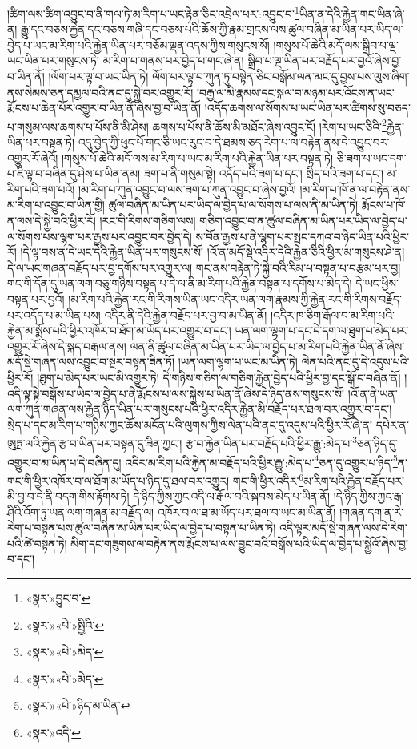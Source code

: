 །ཚིག་ལས་ཚིག་འབྱུང་བ་ནི་གལ་ཏེ་མ་རིག་པ་ཡང་རྟེན་ཅིང་འབྲེལ་པར་:འབྱུང་བ་\footnote{«སྣར་»བྱུང་བ་}ཡིན་ན་དེའི་རྐྱེན་གང་ཡིན་ཞེ་ན། རྒྱུ་དང་བཅས་རྐྱེན་དང་བཅས་གཞི་དང་བཅས་པའི་ཆོས་ཀྱི་རྣམ་གྲངས་ལས་ཚུལ་བཞིན་མ་ཡིན་པར་ཡིད་ལ་བྱེད་པ་ཡང་མ་རིག་པའི་རྐྱེན་ཡིན་པར་བཅོམ་ལྡན་འདས་ཀྱིས་གསུངས་སོ། །གསུས་པོ་ཆེའི་མདོ་ལས་སྒྲིབ་པ་ལྔ་ཡང་ཡིན་པར་གསུངས་ཏེ། མ་རིག་པ་གནས་པར་བྱེད་པ་གང་ཞེ་ན། སྒྲིབ་པ་ལྔ་ཡིན་པར་བརྗོད་པར་བྱའོ་ཞེས་བྱ་བ་ཡིན་ནོ། །ལོག་པར་ལྟ་བ་ཡང་ཡིན་ཏེ། ལོག་པར་ལྟ་བ་ཀུན་ཏུ་བསྟེན་ཅིང་བསྒོམ་ལན་མང་དུ་བྱས་པས་ལུས་ཞིག་ནས་སེམས་ཅན་དམྱལ་བའི་ནང་དུ་སྐྱེ་བར་འགྱུར་རོ། །བརྒྱ་ལ་མི་རྣམས་དང་སྐལ་བ་མཉམ་པར་འོངས་ན་ཡང་རྨོངས་པ་ཆེན་པོར་འགྱུར་བ་ཡིན་ནོ་ཞེས་བྱ་བ་ཡིན་ནོ། །འདོད་ཆགས་ལ་སོགས་པ་ཡང་ཡིན་པར་ཚིགས་སུ་བཅད་པ་གསུམ་ལས་ཆགས་པ་པོས་ནི་མི་ཤེས། ཆགས་པ་པོས་ནི་ཆོས་མི་མཐོང་ཞེས་འབྱུང་ངོ། །རེག་པ་ཡང་ཅིའི་\footnote{«སྣར་»«པེ་»སྤྱིའི་}རྐྱེན་ཡིན་པར་བསྟན་ཏེ། འདུ་བྱེད་ཀྱི་ཕུང་པོ་གང་ཅི་ཡང་རུང་བ་དེ་ཐམས་ཅད་རེག་པ་ལ་བརྟེན་ནས་དེ་འབྱུང་བར་འགྱུར་རོ་ཞེའོ། །གསུས་པོ་ཆེའི་མདོ་ལས་མ་རིག་པ་ཡང་མ་རིག་པའི་རྐྱེན་ཡིན་པར་བསྟན་ཏེ། ཅི་ཟག་པ་ཡང་དག་པ་ཇི་ལྟ་བ་བཞིན་དུ་ཤེས་པ་ཡིན་ནམ། ཟག་པ་ནི་གསུམ་སྟེ། འདོད་པའི་ཟག་པ་དང་། སྲིད་པའི་ཟག་པ་དང་། མ་རིག་པའི་ཟག་པའོ། །མ་རིག་པ་ཀུན་འབྱུང་བ་ལས་ཟག་པ་ཀུན་འབྱུང་བ་ཞེས་བྱའོ། །མ་རིག་པ་ཁོ་ན་ལ་བརྟེན་ནས་མ་རིག་པ་འབྱུང་བ་ཡིན་གྱི། ཚུལ་བཞིན་མ་ཡིན་པར་ཡིད་ལ་བྱེད་པ་ལ་སོགས་པ་ལས་ནི་མ་ཡིན་ཏེ། རྨོངས་པ་ཁོ་ན་ལས་དེ་སྐྱེ་བའི་ཕྱིར་རོ། །རང་གི་རིགས་གཅིག་ལས། གཅིག་འབྱུང་བ་ན་ཚུལ་བཞིན་མ་ཡིན་པར་ཡིད་ལ་བྱེད་པ་ལ་སོགས་པས་ལྷག་པར་རྒྱས་པར་འབྱུང་བར་བྱེད་དེ། ས་བོན་རྒྱས་པ་ནི་ལྷག་པར་སྤང་དཀའ་བ་ཉིད་ཡིན་པའི་ཕྱིར་རོ། །དེ་ལྟ་བས་ན་དེ་ཡང་དེའི་རྐྱེན་ཡིན་པར་གསུངས་སོ། །འོ་ན་མདོ་སྡེ་འདིར་དེའི་རྐྱེན་ཅིའི་ཕྱིར་མ་གསུངས་ཤེ་ན། དེ་ལ་ཡང་གཞན་བརྗོད་པར་བྱ་དགོས་པར་འགྱུར་ལ། གང་ནས་བརྟེན་ཏེ་སྐྱེ་བའི་རིམ་པ་བསྟན་པ་བརྩམ་པར་བྱ། གང་གི་དོན་དུ་ཡན་ལག་བཅུ་གཉིས་བསྟན་པ་དེ་ལ་ནི་མ་རིག་པའི་རྐྱེན་བསྟན་པ་དགོས་པ་མེད་དེ། དེ་ཡང་ཕྱིས་བསྟན་པར་བྱའོ། །མ་རིག་པའི་རྐྱེན་རང་གི་རིགས་ཡིན་ཡང་འདིར་ཡན་ལག་རྣམས་ཀྱི་རྐྱེན་རང་གི་རིགས་བརྗོད་པར་འདོད་པ་མ་ཡིན་པས། འདིར་ནི་དེའི་རྐྱེན་བརྗོད་པར་བྱ་བ་མ་ཡིན་ནོ། །འདིར་ཁ་ཅིག་རྒོལ་བ་མ་རིག་པའི་རྐྱེན་མ་སྨོས་པའི་ཕྱིར་འཁོར་བ་ཐོག་མ་ཡོད་པར་འགྱུར་བ་དང་། ཡན་ལག་ལྷག་པ་དང་དེ་དག་ལ་ཐུག་པ་མེད་པར་འགྱུར་རོ་ཞེས་དེ་སྐད་བརྒལ་ནས། ལན་ནི་ཚུལ་བཞིན་མ་ཡིན་པར་ཡིད་ལ་བྱེད་པ་མ་རིག་པའི་རྐྱེན་ཡིན་ནོ་ཞེས་མདོ་སྡེ་གཞན་ལས་འབྱུང་བ་སྔར་བསྟན་ཟིན་ཏོ། །ཡན་ལག་ལྷག་པ་ཡང་མ་ཡིན་ཏེ། ལེན་པའི་ནང་དུ་དེ་འདུས་པའི་ཕྱིར་རོ། །ཐུག་པ་མེད་པར་ཡང་མི་འགྱུར་ཏེ། དེ་གཉིས་གཅིག་ལ་གཅིག་རྐྱེན་བྱེད་པའི་ཕྱིར་བྱ་དང་སྒོ་ང་བཞིན་ནོ། །འདི་ལྟ་སྟེ་བསྒོས་པ་ཡིད་ལ་བྱེད་པ་ནི་རྨོངས་པ་ལས་སྐྱེས་པ་ཡིན་ནོ་ཞེས་དེ་ཉིད་ནས་གསུངས་སོ། །འོ་ན་ནི་ཡན་ལག་ཀུན་གཞན་ལས་རྐྱེན་ཉིད་ཡིན་པར་གསུངས་པའི་ཕྱིར་འདིར་རྐྱེན་མི་བརྗོད་པར་ཐལ་བར་འགྱུར་བ་དང་། སྲེད་པ་དང་མ་རིག་པ་གཉིས་ཀྱང་ཆོས་མངོན་པའི་ལུགས་ཀྱིས་ལེན་པའི་ནང་དུ་འདུས་པའི་ཕྱིར་རོ་ཞེ་ན། དཔེར་ན་ཨུཏྤ་ལའི་རྐྱེན་རྩ་བ་ཡིན་པར་བསྟན་དུ་ཟིན་ཀྱང་། རྩ་བ་རྐྱེན་ཡིན་པར་བརྗོད་པའི་ཕྱིར་རྒྱུ་:མེད་པ་\footnote{«སྣར་»«པེ་»མེད་}ཅན་ཉིད་དུ་འགྱུར་བ་མ་ཡིན་པ་དེ་བཞིན་དུ། འདིར་མ་རིག་པའི་རྐྱེན་མ་བརྗོད་པའི་ཕྱིར་རྒྱུ་:མེད་པ་\footnote{«སྣར་»«པེ་»མེད་}ཅན་དུ་འགྱུར་པ་ཉིད་\footnote{«སྣར་»«པེ་»ཉིད་མ་ཡིན་}ན་གང་གི་ཕྱིར་འཁོར་བ་ལ་ཐོག་མ་ཡོད་པ་ཉིད་དུ་ཐལ་བར་འགྱུར། གང་གི་ཕྱིར་འདིར་\footnote{«སྣར་»འདི་}མ་རིག་པའི་རྐྱེན་བརྗོད་པར་མི་བྱ་བ་དེ་ནི་བདག་གིས་རྟོགས་ཏེ། དེ་ཉིད་ཀྱིས་ཀྱང་འདི་ལ་རྒོལ་བའི་སྐབས་མེད་པ་ཡིན་ནོ། །དེ་ཉིད་ཀྱིས་ཀྱང་རྒ་ཤིའི་འོག་ཏུ་ཡན་ལག་གཞན་མ་བརྗོད་ལ། འཁོར་བ་ལ་ཐ་མ་ཡོད་པར་ཐལ་བ་ཡང་མ་ཡིན་ནོ། །གཞན་དག་ན་རེ་རེག་པ་བསྟན་པས་ཚུལ་བཞིན་མ་ཡིན་པར་ཡིད་ལ་བྱེད་པ་བསྟན་པ་ཡིན་ཏེ། འདི་ལྟར་མདོ་སྡེ་གཞན་ལས་དེ་རེག་པའི་ཚེ་བསྟན་ཏེ། མིག་དང་གཟུགས་ལ་བརྟེན་ནས་རྨོངས་པ་ལས་བྱུང་བའི་བསྒོས་པའི་ཡིད་ལ་བྱེད་པ་སྐྱེའོ་ཞེས་བྱ་བ་དང་། 